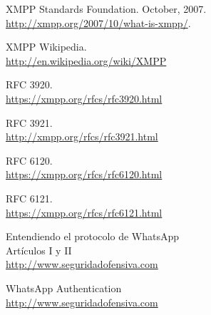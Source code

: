 \documentclass[a4paper, 11pt]{article} %
\begin{document}
\vfill
\begin{thebibliography}{9}

  XMPP Standards Foundation. October, 2007.\\
  \url{http://xmpp.org/2007/10/what-is-xmpp/}.
  
  XMPP Wikipedia.\\
  \url{http://en.wikipedia.org/wiki/XMPP}
  
  RFC 3920.\\
  \url{https://xmpp.org/rfcs/rfc3920.html}
  
  RFC 3921.\\
  \url{http://xmpp.org/rfcs/rfc3921.html}

  RFC 6120.\\
  \url{https://xmpp.org/rfcs/rfc6120.html}
  
  RFC 6121.\\
  \url{https://xmpp.org/rfcs/rfc6121.html}
  
  Entendiendo el protocolo de WhatsApp\\
  Artículos I y II\\
  \url{http://www.seguridadofensiva.com}

  WhatsApp Authentication\\
  \url{http://www.seguridadofensiva.com}

\end{thebibliography} 
  
\end{document}
